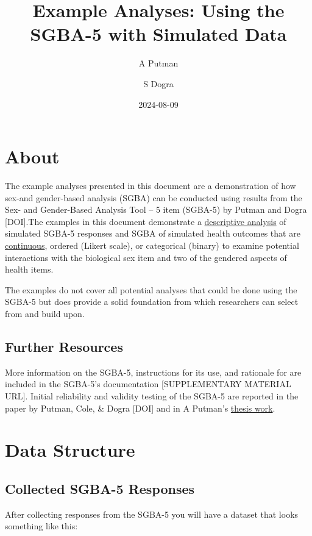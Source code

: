 \documentclass[
]{book}
\title{Example Analyses: Using the SGBA-5 with Simulated Data}
\author{A Putman \and S Dogra}
\date{2024-08-09}
\begin{document}
\maketitle

{
\setcounter{tocdepth}{1}
\tableofcontents
}
\chapter{About}\label{about}

The example analyses presented in this document are a demonstration of how sex-and gender-based analysis (SGBA) can be conducted using results from the Sex- and Gender-Based Analysis Tool -- 5 item (SGBA-5) by Putman and Dogra {[}DOI{]}.The examples in this document demonstrate a \hyperref[ux5cux23descriptive-analysis]{descriptive analysis} of simulated SGBA-5 responses and SGBA of simulated health outcomes that are \hyperref[continuous]{continuous}, ordered (Likert scale), or categorical (binary) to examine potential interactions with the biological sex item and two of the gendered aspects of health items.

The examples do not cover all potential analyses that could be done using the SGBA-5 but does provide a solid foundation from which researchers can select from and build upon.

\section{Further Resources}\label{further-resources}

More information on the SGBA-5, instructions for its use, and rationale for are included in the SGBA-5's documentation {[}SUPPLEMENTARY MATERIAL URL{]}. Initial reliability and validity testing of the SGBA-5 are reported in the paper by Putman, Cole, \& Dogra {[}DOI{]} and in A Putman's \href{https://ontariotechu.scholaris.ca/items/fddf2667-8cd6-429d-85bd-74b0076ab561}{thesis work}.

\chapter{Data Structure}\label{data-structure}

\section{Collected SGBA-5 Responses}\label{collected-sgba-5-responses}

After collecting responses from the SGBA-5 you will have a dataset that looks something like this:
\end{document}
